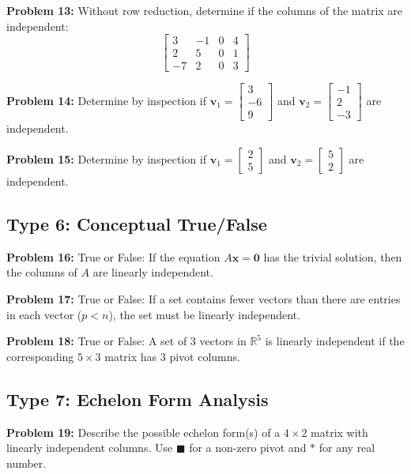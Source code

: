 \documentclass[12pt]{article}
\begin{document}
\textbf{Problem 13:} Without row reduction, determine if the columns of the matrix are independent:
$$ \begin{bmatrix} 3 & -1 & 0 & 4 \\ 2 & 5 & 0 & 1 \\ -7 & 2 & 0 & 3 \end{bmatrix} $$

\textbf{Problem 14:} Determine by inspection if $\mathbf{v}_1 = \begin{bmatrix} 3 \\ -6 \\ 9 \end{bmatrix}$ and $\mathbf{v}_2 = \begin{bmatrix} -1 \\ 2 \\ -3 \end{bmatrix}$ are independent.

\textbf{Problem 15:} Determine by inspection if $\mathbf{v}_1 = \begin{bmatrix} 2 \\ 5 \end{bmatrix}$ and $\mathbf{v}_2 = \begin{bmatrix} 5 \\ 2 \end{bmatrix}$ are independent.

\subsection*{Type 6: Conceptual True/False}
\textbf{Problem 16:} True or False: If the equation $A\mathbf{x} = \mathbf{0}$ has the trivial solution, then the columns of $A$ are linearly independent.

\textbf{Problem 17:} True or False: If a set contains fewer vectors than there are entries in each vector ($p < n$), the set must be linearly independent.

\textbf{Problem 18:} True or False: A set of 3 vectors in $\mathbb{R}^5$ is linearly independent if the corresponding $5 \times 3$ matrix has 3 pivot columns.

\subsection*{Type 7: Echelon Form Analysis}
\textbf{Problem 19:} Describe the possible echelon form(s) of a $4 \times 2$ matrix with linearly independent columns. Use $\blacksquare$ for a non-zero pivot and $*$ for any real number.
\end{document}
